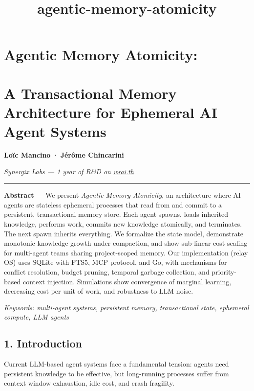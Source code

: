 \documentclass[11pt]{article}
\title{agentic-memory-atomicity}
\begin{document}
    
    \maketitle
    
    

    
    \section{Agentic Memory Atomicity:}\label{agentic-memory-atomicity}

\section{A Transactional Memory Architecture for Ephemeral AI Agent
Systems}\label{a-transactional-memory-architecture-for-ephemeral-ai-agent-systems}

\textbf{Loïc Mancino} · \textbf{Jérôme Chincarini}

\emph{Synergix Labs --- 1 year of R\&D on
\href{https://wrai.th}{wrai.th}}

\begin{center}\rule{0.5\linewidth}{0.5pt}\end{center}

\textbf{Abstract} --- We present \emph{Agentic Memory Atomicity}, an
architecture where AI agents are stateless ephemeral processes that read
from and commit to a persistent, transactional memory store. Each agent
spawns, loads inherited knowledge, performs work, commits new knowledge
atomically, and terminates. The next spawn inherits everything. We
formalize the state model, demonstrate monotonic knowledge growth under
compaction, and show sub-linear cost scaling for multi-agent teams
sharing project-scoped memory. Our implementation (relay OS) uses SQLite
with FTS5, MCP protocol, and Go, with mechanisms for conflict
resolution, budget pruning, temporal garbage collection, and
priority-based context injection. Simulations show convergence of
marginal learning, decreasing cost per unit of work, and robustness to
LLM noise.

\emph{Keywords: multi-agent systems, persistent memory, transactional
state, ephemeral compute, LLM agents}

    \subsection{1. Introduction}\label{introduction}

Current LLM-based agent systems face a fundamental tension: agents need
persistent knowledge to be effective, but long-running processes suffer
from context window exhaustion, idle cost, and crash fragility.
\end{document}
